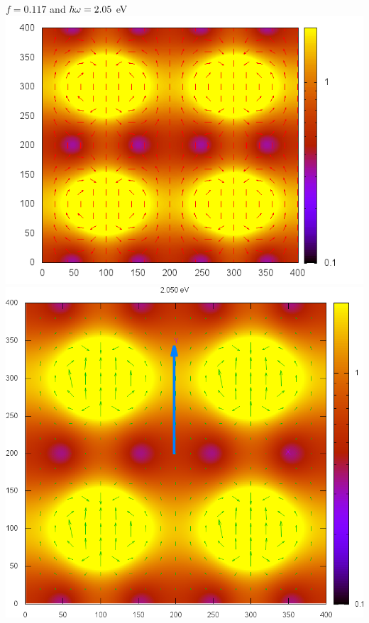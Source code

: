 \documentclass[preprint,12pt]{revtex4}
\begin{document}
\begin{center}
$f=0.117$ and $\hbar\omega=2.05$ eV
\includegraphics[scale=.31]{plots/manda/dipolar_W2.05_f.117}%
\includegraphics[scale=.2]{plots/manda/e-cilindro_A0.00_S1.000_f0.117_principal_0.00_ave_Nh_100_epsa_au_W2.050_epsb_8.000-0.000_dir_yp-dat.2x2}%
\end{center}
\newpage
\end{document}
